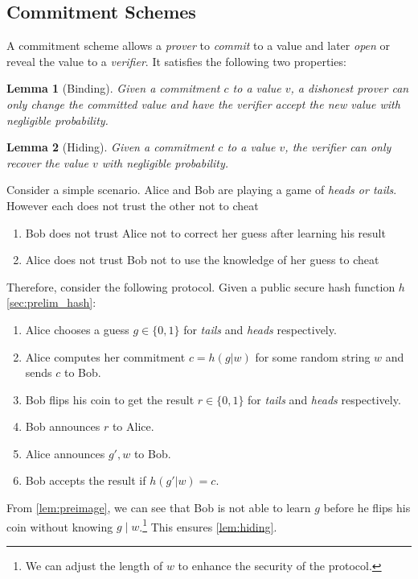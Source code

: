 \documentclass[11pt]{report}
\theoremstyle{definition}
\theoremstyle{plain}
\newtheorem{lemma}{Lemma}[section]
\begin{document}
\subsection{Commitment Schemes}
A commitment scheme allows a \textit{prover} to \textit{commit} to a value and later \textit{open} or reveal the value to a \textit{verifier}. It satisfies the following two properties:

\begin{lemma}[Binding]\label{lem:binding}
  Given a commitment $c$ to a value $v$, a dishonest prover can only change the committed value and have the verifier accept the new value with negligible probability.
\end{lemma}
\begin{lemma}[Hiding]\label{lem:hiding}
  Given a commitment $c$ to a value $v$, the verifier can only recover the value $v$ with negligible probability.
\end{lemma}

Consider a simple scenario. Alice and Bob are playing a game of \textit{heads or tails}. However each does not trust the other not to cheat
\begin{enumerate}[parsep=0pt, itemsep=0pt]
  \item Bob does not trust Alice not to correct her guess after learning his result
  \item Alice does not trust Bob not to use the knowledge of her guess to cheat
\end{enumerate}
Therefore, consider the following protocol. Given a public secure hash function $h$ \autoref{sec:prelim_hash}:
\begin{enumerate}[parsep=0pt, itemsep=0pt]
  \item Alice chooses a guess $g \in \{0,1\}$ for \textit{tails} and \textit{heads} respectively.
  \item Alice computes her commitment $c = h(g | w)$ for some random string $w$ and sends $c$ to Bob.
  \item Bob flips his coin to get the result $r \in \{0,1\}$ for \textit{tails} and \textit{heads} respectively.
  \item Bob announces $r$ to Alice.
  \item Alice announces $g', w$ to Bob.
  \item Bob accepts the result if $h(g' | w) = c$.
\end{enumerate}

From \autoref{lem:preimage}, we can see that Bob is not able to learn $g$ before he flips his coin without knowing $g \mid w$.\footnote{We can adjust the length of $w$ to enhance the security of the protocol.} This ensures \autoref{lem:hiding}.
\end{document}
